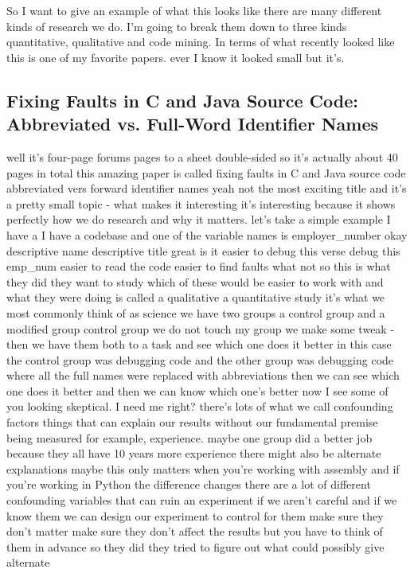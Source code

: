 \documentclass[conference, compsoc, twoside]{IEEEtran}
\begin{document}
So I want to give an example of what this looks like there are many different kinds of research we do.
I'm going to break them down to three kinds quantitative, qualitative and code mining.
In terms of what recently looked like this is one of my favorite papers.
ever I know it looked small but it's.
\subsection{Fixing Faults in C and Java Source Code: Abbreviated vs. Full-Word Identifier Names}
well it's four-page forums pages to a sheet double-sided so it's actually about 40 pages in total this amazing paper is called fixing faults in C and Java source code
abbreviated vers forward identifier
names yeah not the most exciting title
and it's a pretty small topic - what
makes it interesting it's interesting
because it shows perfectly how we do
research and why it matters.
let's take a simple example I have a I
have a codebase and one of the variable
names is employer\_number okay
descriptive name descriptive title great
is it easier to debug this verse debug
this emp\_num easier to read the code
easier to find faults what not so this
is what they did they want to study
which of these would be easier to work
with and what they were doing is called a qualitative a quantitative study it's
what we most commonly think of as science we have two groups a control
group and a modified group control group
we do not touch my group we make some
tweak - then we have them both to a task
and see which one does it better in this
case the control group was debugging
code and the other group was debugging
code where all the full names were
replaced with abbreviations then we can
see which one does it better and then we
can know which one's better now I see
some of you looking skeptical. I need me
right? there's lots of what we call
confounding factors things that can
explain our results without our
fundamental premise being measured for
example, experience.
 maybe one group did a better job because they all have 10
years more experience there might also
be alternate explanations
maybe this only matters when you're
working with assembly and if you're
working in Python the difference changes
there are a lot of different confounding
variables that can ruin an experiment if
we aren't careful and if we know them we
can design our experiment to control for
them make sure they don't matter
make sure they don't affect the results
but you have to think of them in advance
so they did they tried to figure out
what could possibly give alternate
\end{document}
